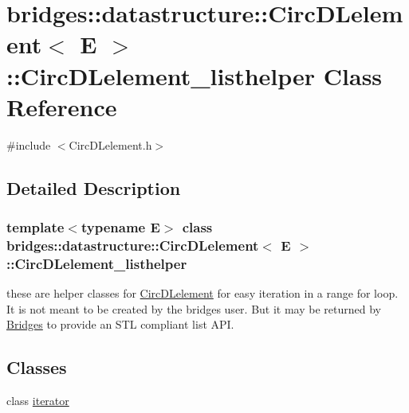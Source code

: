 \hypertarget{classbridges_1_1datastructure_1_1_circ_d_lelement_1_1_circ_d_lelement__listhelper}{}\section{bridges\+:\+:datastructure\+:\+:Circ\+D\+Lelement$<$ E $>$\+:\+:Circ\+D\+Lelement\+\_\+listhelper Class Reference}
\label{classbridges_1_1datastructure_1_1_circ_d_lelement_1_1_circ_d_lelement__listhelper}


{\ttfamily \#include $<$Circ\+D\+Lelement.\+h$>$}



\subsection{Detailed Description}
\subsubsection*{template$<$typename E$>$\newline
class bridges\+::datastructure\+::\+Circ\+D\+Lelement$<$ E $>$\+::\+Circ\+D\+Lelement\+\_\+listhelper}

these are helper classes for \hyperlink{classbridges_1_1datastructure_1_1_circ_d_lelement}{Circ\+D\+Lelement} for easy iteration in a range for loop. It is not meant to be created by the bridges user. But it may be returned by \hyperlink{classbridges_1_1_bridges}{Bridges} to provide an S\+TL compliant list A\+PI. \subsection*{Classes}
\begin{DoxyCompactItemize}
\item 
class \hyperlink{classbridges_1_1datastructure_1_1_circ_d_lelement_1_1_circ_d_lelement__listhelper_1_1iterator}{iterator}
\end{DoxyCompactItemize}
